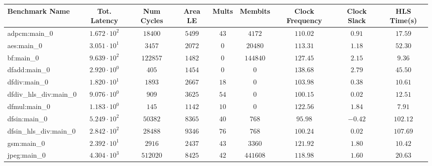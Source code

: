 \begin{tabular}{|l|c|c|c|c|c|c|c|c|}
\hline
Benchmark Name          & Tot. Latency           & Num Cycles & Area LE   & Mults   & Membits    & Clock Frequency & Clock Slack & HLS Time(s) \\
\hline
adpcm:main\_0           & $ 1.672 \cdot 10^{2} $ & $ 18400  $ & $ 5499  $ & $ 43  $ & $ 4172   $ & $ 110.02      $ & $ 0.91    $ & $ 17.59   $ \\
aes:main\_0             & $ 3.051 \cdot 10^{1} $ & $ 3457   $ & $ 2072  $ & $ 0   $ & $ 20480  $ & $ 113.31      $ & $ 1.18    $ & $ 52.30   $ \\
bf:main\_0              & $ 9.639 \cdot 10^{2} $ & $ 122857 $ & $ 1482  $ & $ 0   $ & $ 144840 $ & $ 127.45      $ & $ 2.15    $ & $ 9.36    $ \\
dfadd:main\_0           & $ 2.920 \cdot 10^{0} $ & $ 405    $ & $ 1454  $ & $ 0   $ & $ 0      $ & $ 138.68      $ & $ 2.79    $ & $ 45.50   $ \\
dfdiv:main\_0           & $ 1.820 \cdot 10^{1} $ & $ 1893   $ & $ 2667  $ & $ 18  $ & $ 0      $ & $ 103.98      $ & $ 0.38    $ & $ 10.61   $ \\
dfdiv\_hls\_div:main\_0 & $ 9.076 \cdot 10^{0} $ & $ 909    $ & $ 3625  $ & $ 54  $ & $ 0      $ & $ 100.15      $ & $ 0.02    $ & $ 12.51   $ \\
dfmul:main\_0           & $ 1.183 \cdot 10^{0} $ & $ 145    $ & $ 1142  $ & $ 10  $ & $ 0      $ & $ 122.56      $ & $ 1.84    $ & $ 7.91    $ \\
dfsin:main\_0           & $ 5.249 \cdot 10^{2} $ & $ 50382  $ & $ 8365  $ & $ 40  $ & $ 768    $ & $ 95.98       $ & $ -0.42   $ & $ 102.12  $ \\
dfsin\_hls\_div:main\_0 & $ 2.842 \cdot 10^{2} $ & $ 28488  $ & $ 9346  $ & $ 76  $ & $ 768    $ & $ 100.24      $ & $ 0.02    $ & $ 107.69  $ \\
gsm:main\_0             & $ 2.392 \cdot 10^{1} $ & $ 2916   $ & $ 2437  $ & $ 43  $ & $ 3360   $ & $ 121.92      $ & $ 1.80    $ & $ 10.42   $ \\
jpeg:main\_0            & $ 4.304 \cdot 10^{3} $ & $ 512020 $ & $ 8425  $ & $ 42  $ & $ 441608 $ & $ 118.98      $ & $ 1.60    $ & $ 20.63   $ \\

\end{tabular}
